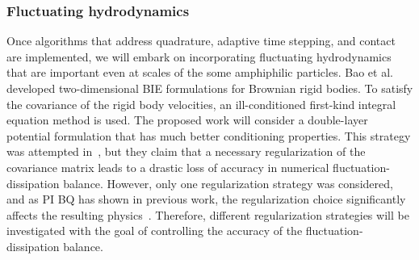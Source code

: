\subsubsection{Fluctuating hydrodynamics}
\label{subsec:fluctuating}
Once algorithms that address quadrature, adaptive time stepping, and
contact are implemented, we will embark on incorporating fluctuating
hydrodynamics that are important even at scales of the some amphiphilic
particles. Bao et al.~\cite{Bao17,Bao18} developed two-dimensional BIE
formulations for Brownian rigid bodies. To satisfy the covariance of the
rigid body velocities, an ill-conditioned first-kind integral equation
method is used. The proposed work will consider a double-layer potential
formulation that has much better conditioning properties. This strategy
was attempted in~\cite{Bao18}, but they claim that a necessary
regularization of the covariance matrix leads to a drastic loss of
accuracy in numerical fluctuation-dissipation balance. However, only one
regularization strategy was considered, and as PI BQ has shown in
previous work, the regularization choice significantly affects the
resulting physics~\cite{ong-chr-qua2017}. Therefore, different
regularization strategies will be investigated with the goal of
controlling the accuracy of the fluctuation-dissipation balance.


